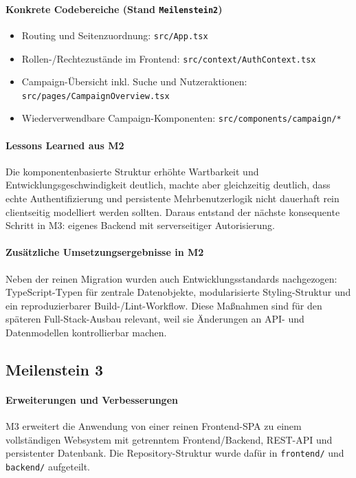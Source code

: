 \paragraph{Konkrete Codebereiche (Stand \texttt{Meilenstein2})}
\begin{itemize}
  \item Routing und Seitenzuordnung: \texttt{src/App.tsx}
  \item Rollen-/Rechtezustände im Frontend: \texttt{src/context/AuthContext.tsx}
  \item Campaign-Übersicht inkl. Suche und Nutzeraktionen:
  \texttt{src/pages/CampaignOverview.tsx}
  \item Wiederverwendbare Campaign-Komponenten:
  \texttt{src/components/campaign/*}
\end{itemize}

\paragraph{Lessons Learned aus M2}
Die komponentenbasierte Struktur erhöhte Wartbarkeit und Entwicklungsgeschwindigkeit
deutlich, machte aber gleichzeitig deutlich, dass echte Authentifizierung und
persistente Mehrbenutzerlogik nicht dauerhaft rein clientseitig modelliert
werden sollten.
Daraus entstand der nächste konsequente Schritt in M3: eigenes Backend mit
serverseitiger Autorisierung.

\paragraph{Zusätzliche Umsetzungsergebnisse in M2}
Neben der reinen Migration wurden auch Entwicklungsstandards nachgezogen:
TypeScript-Typen für zentrale Datenobjekte, modularisierte Styling-Struktur und
ein reproduzierbarer Build-/Lint-Workflow.
Diese Maßnahmen sind für den späteren Full-Stack-Ausbau relevant, weil sie
Änderungen an API- und Datenmodellen kontrollierbar machen.

\subsection{Meilenstein 3}

\paragraph{Erweiterungen und Verbesserungen}
M3 erweitert die Anwendung von einer reinen Frontend-SPA zu einem
vollständigen Websystem mit getrenntem Frontend/Backend, REST-API und
persistenter Datenbank.
Die Repository-Struktur wurde dafür in \texttt{frontend/} und \texttt{backend/}
aufgeteilt.

